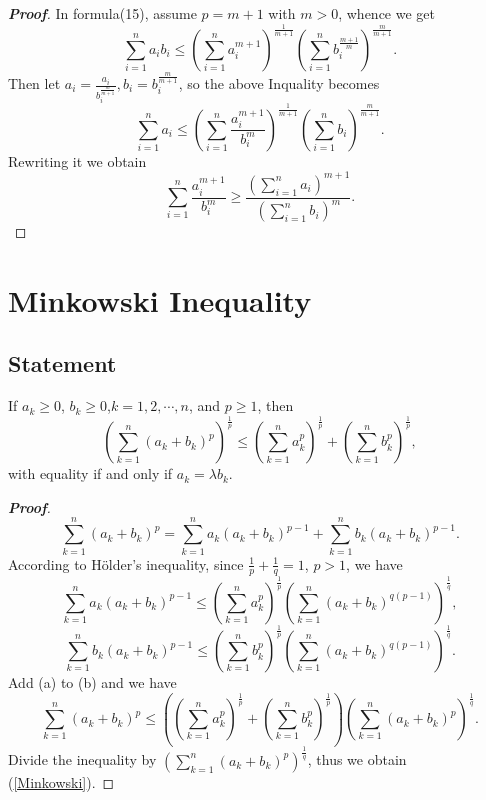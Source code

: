 \documentclass[a4paper]{report}
\begin{document}
\begin{proof}[\bf{Proof}]
In formula(15), assume $p=m+1$ with $m>0$, whence we get
\[\sum_{i=1}^na_ib_i\leqslant
\left(\sum_{i=1}^na_i^{m+1}\right)^{\frac{1}{m+1}}
\left(\sum_{i=1}^nb_i^{\frac{m+1}{m}}\right)^{\frac{m}{m+1}}.\] Then let $a_i=\displaystyle\frac{a_i}{b_i^{\frac{m}{m+1}}}, b_i=b_i^{\frac{m}{m+1}}$, so the above Inquality becomes
\[\sum_{i=1}^na_i\leqslant
\left(\sum_{i=1}^n\frac{a_i^{m+1}}{b_i^m}\right)^{\frac{1}{m+1}}
\left(\sum_{i=1}^n b_i\right)^{\frac{m}{m+1}}.\]
Rewriting it we obtain
  \[\sum_{i=1}^n \frac{a_i^{m+1}}{b_i^m}\geqslant\frac{\left(\displaystyle\sum_{i=1}^n a_i\right)^{m+1}}{\left(\displaystyle\sum_{i=1}^n b_i\right)^{m}}.\]
\end{proof}

\chapter{Minkowski Inequality}
\section{Statement}
\begin{thr}
If $a_k\geqslant0$, $b_k\geqslant0$,$ k=1,2,\cdots,n$, and $p\ge 1$, then
\begin{equation}
\left( \sum \limits^{n}_{k=1}\left( a_{k}+b_{k}\right) ^{p}\right) ^{\frac{1}{p} }\leqslant \left( \sum \limits^{n}_{k=1}a^{p}_{k}\right) ^{\frac{1}{p} }+\left( \sum \limits^{n}_{k=1}b^{p}_{k}\right) ^{\frac{1}{p} },\label{Minkowski}
\end{equation}
with equality if and only if $a_k=\lambda b_k$.
\end{thr}

\begin{proof}[\bf{Proof}]
\[
\sum \limits^{n}_{k=1}\left( a_{k}+b_{k}\right) ^{p}=\sum \limits^{n}_{k=1}a_{k}\left( a_{k}+b_{k}\right) ^{p-1}+\sum \limits^{n}_{k=1}b_{k}\left( a_{k}+b_{k}\right) ^{p-1}.\]
According to H\"{o}lder's inequality, since $\frac{1}{p} +\frac{1}{q} =1$, $p>1$, we have
\[\sum \limits^{n}_{k=1}a_{k}\left( a_{k}+b_{k}\right) ^{p-1}\leqslant \left( \sum \limits^{n}_{k=1}a^{p}_{k}\right) ^{\frac{1}{p} }\left( \sum \limits^{n}_{k=1}\left( a_{k}+b_{k}\right) ^{q\left( p-1\right) }\right) ^{\frac{1}{q} },
\tag{a}\]
\[\sum \limits^{n}_{k=1}b_{k}\left( a_{k}+b_{k}\right) ^{p-1}\leqslant \left( \sum \limits^{n}_{k=1}b^{p}_{k}\right) ^{\frac{1}{p} }\left( \sum \limits^{n}_{k=1}\left( a_{k}+b_{k}\right) ^{q\left( p-1\right) }\right) ^{\frac{1}{q} }.
\tag{b}\]
Add (a) to (b) and we have
\[\sum \limits^{n}_{k=1}\left( a_{k}+b_{k}\right) ^{p}\leqslant\left(\left( \sum \limits^{n}_{k=1}a^{p}_{k}\right) ^{\frac{1}{p} }+\left( \sum \limits^{n}_{k=1}b^{p}_{k}\right) ^{\frac{1}{p} }\right)\left( \sum \limits^{n}_{k=1}\left( a_{k}+b_{k}\right) ^{p}\right) ^{\frac{1}{q} }.\]
Divide the inequality by $\left( \sum \limits^{n}_{k=1}\left( a_{k}+b_{k}\right) ^{p}\right) ^{\frac{1}{q} }$, thus we obtain (\ref{Minkowski}).
\end{proof}
\end{document}
